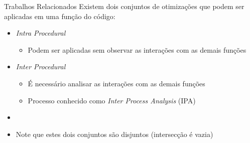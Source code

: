 \begin{frame}{Trabalhos Relacionados}
    Existem dois conjuntos de otimizações que podem ser aplicadas em uma função do código:
  \begin{itemize}
    \item \textit{Intra Procedural}
        \begin{itemize}
            \item Podem ser aplicadas sem observar as interações com as demais funções
        \end{itemize}
    \item \textit{Inter Procedural}
        \begin{itemize}
            \item É necessário analisar as interações com as demais funções
            \item Processo conhecido como \textit{Inter Process Analysis} (IPA)
        \end{itemize}
    \item[]
    \item Note que estes dois conjuntos são disjuntos (intersecção é vazia)
  \end{itemize}
\end{frame}


